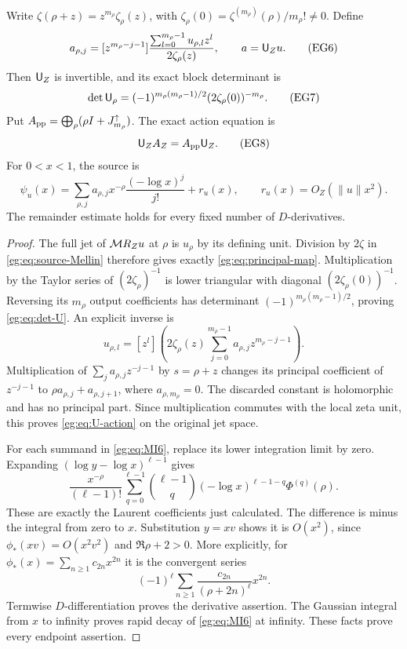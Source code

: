 \documentclass[11pt]{article}
\begin{document}
\begin{egproposition}\label{eg:prop:principal}
Write $\zeta(\rho+z)=z^{m_\rho}\zeta_\rho(z)$, with
$\zeta_\rho(0)=\zeta^{(m_\rho)}(\rho)/m_\rho!\ne0$. Define
\[
 a_{\rho,j}=[z^{m_\rho-j-1}]
 \frac{\sum_{l=0}^{m_\rho-1}u_{\rho,l}z^l}{2\zeta_\rho(z)},
 \qquad a=\mathsf U_Zu.\tag{EG6}\label{eg:eq:principal-map}
\]
Then $\mathsf U_Z$ is invertible, and its exact block determinant is
\[
 \det\mathsf U_\rho=(-1)^{m_\rho(m_\rho-1)/2}
                         (2\zeta_\rho(0))^{-m_\rho}.
 \tag{EG7}\label{eg:eq:det-U}
\]
Put $A_{\rm pp}=\bigoplus_\rho(\rho I+J^\uparrow_{m_\rho})$.
The exact action equation is
\[
 \mathsf U_ZA_Z=A_{\rm pp}\mathsf U_Z.\tag{EG8}\label{eg:eq:U-action}
\]
For $0<x<1$, the source is
\[
 \psi_u(x)=\sum_{\rho,j}a_{\rho,j}
                   x^{-\rho}\frac{(-\log x)^j}{j!}+r_u(x),
 \qquad r_u(x)=O_Z(\|u\|x^2).
 \tag{EG9}\label{eg:eq:source-singular}
\]
The remainder estimate holds for every fixed number of $D$-derivatives.
\end{egproposition}
\begin{proof}
The full jet of $\mathcal M R_Zu$ at $\rho$ is $u_\rho$ by its defining
unit. Division by $2\zeta$ in \eqref{eg:eq:source-Mellin} therefore gives
exactly \eqref{eg:eq:principal-map}. Multiplication by the Taylor series
of $(2\zeta_\rho)^{-1}$ is lower triangular with diagonal
$(2\zeta_\rho(0))^{-1}$. Reversing its $m_\rho$ output coefficients
has determinant $(-1)^{m_\rho(m_\rho-1)/2}$, proving \eqref{eg:eq:det-U}.
An explicit inverse is
\[
 u_{\rho,l}=[z^l]\left(2\zeta_\rho(z)
                     \sum_{j=0}^{m_\rho-1}a_{\rho,j}z^{m_\rho-j-1}\right).
\]
Multiplication of $\sum_j a_{\rho,j}z^{-j-1}$ by $s=\rho+z$
changes its principal coefficient of $z^{-j-1}$ to
$\rho a_{\rho,j}+a_{\rho,j+1}$, where $a_{\rho,m_\rho}=0$.
The discarded constant is holomorphic and has no principal part.
Since multiplication commutes with the local zeta unit, this proves
\eqref{eg:eq:U-action} on the original jet space.

For each summand in \eqref{eg:eq:MI6}, replace its lower integration
limit by zero. Expanding $(\log y-\log x)^{\ell-1}$ gives
\[
 \frac{x^{-\rho}}{(\ell-1)!}
 \sum_{q=0}^{\ell-1}\binom{\ell-1}{q}
 (-\log x)^{\ell-1-q}\Phi^{(q)}(\rho).
\]
These are exactly the Laurent coefficients just calculated. The
difference is minus the integral from zero to $x$. Substitution
$y=xv$ shows it is $O(x^2)$, since $\phi_*(xv)=O(x^2v^2)$ and
$\Re\rho+2>0$. More explicitly, for
$\phi_*(x)=\sum_{n\ge1}c_{2n}x^{2n}$ it is the convergent series
\[
 (-1)^\ell\sum_{n\ge1}\frac{c_{2n}}{(\rho+2n)^\ell}x^{2n}.
\]
Termwise $D$-differentiation proves the derivative assertion. The
Gaussian integral from $x$ to infinity proves rapid decay of
\eqref{eg:eq:MI6} at infinity. These facts prove every endpoint assertion.
\end{proof}
\end{document}

